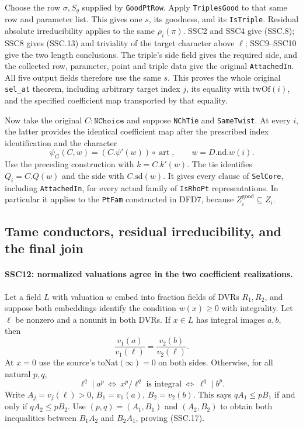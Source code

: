 \documentclass[11pt,a4paper]{article}
\numberwithin{equation}{section}
\theoremstyle{remark}\newtheorem{remark}[theorem]{Remark}
\begin{document}
Choose the row $\sigma,S_g$ supplied by \texttt{Good\allowbreak Pt\allowbreak Row}.
Apply \texttt{Triples\allowbreak Good} to that same row and parameter list.
This gives one $s$, its goodness, and its \texttt{Is\allowbreak Triple}.
Residual absolute irreducibility applies to the same
$\rho_i(\pi)$. SSC2 and SSC4 give (SSC.8); SSC8 gives
(SSC.13) and triviality of the target character above $\ell$;
SSC9--SSC10 give the two length conclusions. The triple's side
field gives the required side, and the collected row, parameter,
point and triple data give the original \texttt{Attached\allowbreak In}.
All five output fields therefore use the same $s$. This proves
the whole original \texttt{sel\_\allowbreak at} theorem, including arbitrary
target index $j$, its equality with $\mathrm{twOf}(i)$, and the
specified coefficient map transported by that equality.

Now take the original $C:\texttt{NChoice}$ and suppose
\texttt{NCh\allowbreak Tie} and \texttt{Same\allowbreak Twist}. At every $i$, the latter
provides the identical coefficient map after the prescribed
index identification and the character
\[
 \psi_G(C,w)=(C.\psi'(w))\circ\operatorname{art},
       \qquad w=D.\mathrm{nd}.w(i).                           \tag{SSC.16}
\]
Use the preceding construction with $k=C.k'(w)$. The tie identifies
$Q_i=C.Q(w)$ and the side with $C.\mathrm{sd}(w)$.
It gives every clause of \texttt{Sel\allowbreak Core}, including
\texttt{Attached\allowbreak In}, for every actual family of \texttt{Is\allowbreak Rho\allowbreak Pt}
representations. In particular it applies to the \texttt{Pt\allowbreak Fam}
constructed in DFD7, because $Z_i^{\mathrm{good}}\subseteq Z_i$.

\subsection{Tame conductors, residual irreducibility, and the final join}

\paragraph{SSC12: normalized valuations agree in the two coefficient realizations.}
\label{claim:SSC12}
Let a field $L$ with valuation $w$ embed into fraction fields of
DVRs $R_1,R_2$, and suppose both embeddings identify the condition
$w(x)\ge0$ with integrality. Let $\ell$ be nonzero and a nonunit
in both DVRs. If $x\in L$ has integral images $a,b$, then
\[
             \frac{v_1(a)}{v_1(\ell)}
                  =\frac{v_2(b)}{v_2(\ell)}.                 \tag{SSC.17}
\]
At $x=0$ use the source's $\mathrm{toNat}(\infty)=0$ on both
sides. Otherwise, for all natural $p,q$,
\[
 \ell^q\mid a^p
   \ \Longleftrightarrow\ x^p/\ell^q\text{ is integral}
   \ \Longleftrightarrow\ \ell^q\mid b^p.
\]
Write $A_j=v_j(\ell)>0$, $B_1=v_1(a)$, $B_2=v_2(b)$.
This says $qA_1\le pB_1$ if and only if $qA_2\le pB_2$.
Use $(p,q)=(A_1,B_1)$ and $(A_2,B_2)$ to obtain both
inequalities between $B_1A_2$ and $B_2A_1$, proving (SSC.17).
\end{document}
